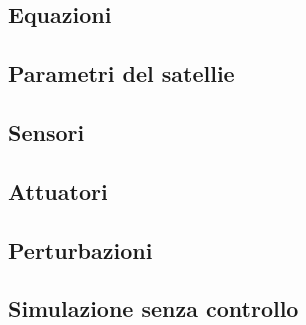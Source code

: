 \subsection{Equazioni}

\subsection{Parametri del satellie}

\subsection{Sensori}

\subsection{Attuatori}

\subsection{Perturbazioni}

\subsection{Simulazione senza controllo}

